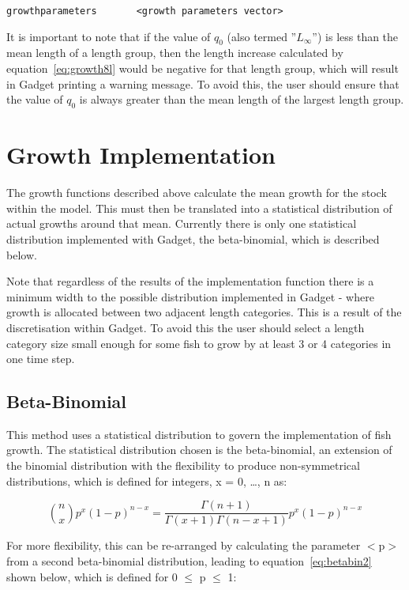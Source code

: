 \documentclass [a4paper, 10pt]{book}
\begin{document}
{\small\begin{verbatim}
growthparameters       <growth parameters vector>
\end{verbatim}}

It is important to note that if the value of $q_{0}$ (also termed ''$L_{\infty}$'') is less than the mean length of a length group, then the length increase calculated by equation~\ref{eq:growth8l} would be negative for that length group, which will result in Gadget printing a warning message.  To avoid this, the user should ensure that the value of $q_{0}$ is always greater than the mean length of the largest length group.

\section{Growth Implementation}\label{sec:stockgrowthimplement}
The growth functions described above calculate the mean growth for the stock within the model. This must then be translated into a statistical distribution of actual growths around that mean.  Currently there is only one statistical distribution implemented with Gadget, the beta-binomial, which is described below.

\bigskip
Note that regardless of the results of the implementation function there is a minimum width to the possible distribution implemented in Gadget - where growth is allocated between two adjacent length categories.  This is a result of the discretisation within Gadget.  To avoid this the user should select a length category size small enough for some fish to grow by at least 3 or 4 categories in one time step.

\subsection{Beta-Binomial}
This method uses a statistical distribution to govern the implementation of fish growth.  The statistical distribution chosen is the beta-binomial, an extension of the binomial distribution with the flexibility to produce non-symmetrical distributions, which is defined for integers, x = 0, \ldots, n as:

\begin{equation}\label{eq:betabin1}
{n \choose x}p^x (1-p)^{n-x} = \frac{\Gamma(n+1)}{\Gamma(x+1)\Gamma(n-x+1)}p^x(1-p)^{n-x}
\end{equation}

For more flexibility, this can be re-arranged by calculating the parameter $<$p$>$ from a second beta-binomial distribution, leading to equation~\ref{eq:betabin2} shown below, which is defined for 0 $\le$ p $\le$ 1:
\end{document}
